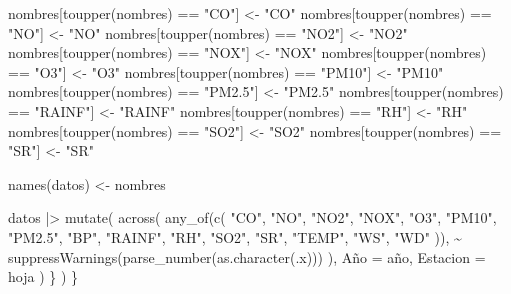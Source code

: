 \documentclass[
  letterpaper,
  DIV=11,
  numbers=noendperiod]{scrartcl}
\newenvironment{Shaded}{\begin{snugshade}}{\end{snugshade}}
\newcommand{\AttributeTok}[1]{\textcolor[rgb]{0.40,0.45,0.13}{#1}}
\newcommand{\FunctionTok}[1]{\textcolor[rgb]{0.28,0.35,0.67}{#1}}
\newcommand{\NormalTok}[1]{\textcolor[rgb]{0.00,0.23,0.31}{#1}}
\newcommand{\OtherTok}[1]{\textcolor[rgb]{0.00,0.23,0.31}{#1}}
\newcommand{\SpecialCharTok}[1]{\textcolor[rgb]{0.37,0.37,0.37}{#1}}
\newcommand{\StringTok}[1]{\textcolor[rgb]{0.13,0.47,0.30}{#1}}
\begin{document}
\begin{Shaded}
\begin{Highlighting}[]
\NormalTok{      nombres[}\FunctionTok{toupper}\NormalTok{(nombres) }\SpecialCharTok{==} \StringTok{"CO"}\NormalTok{] }\OtherTok{\textless{}{-}} \StringTok{"CO"}
\NormalTok{      nombres[}\FunctionTok{toupper}\NormalTok{(nombres) }\SpecialCharTok{==} \StringTok{"NO"}\NormalTok{] }\OtherTok{\textless{}{-}} \StringTok{"NO"}
\NormalTok{      nombres[}\FunctionTok{toupper}\NormalTok{(nombres) }\SpecialCharTok{==} \StringTok{"NO2"}\NormalTok{] }\OtherTok{\textless{}{-}} \StringTok{"NO2"}
\NormalTok{      nombres[}\FunctionTok{toupper}\NormalTok{(nombres) }\SpecialCharTok{==} \StringTok{"NOX"}\NormalTok{] }\OtherTok{\textless{}{-}} \StringTok{"NOX"}
\NormalTok{      nombres[}\FunctionTok{toupper}\NormalTok{(nombres) }\SpecialCharTok{==} \StringTok{"O3"}\NormalTok{] }\OtherTok{\textless{}{-}} \StringTok{"O3"}
\NormalTok{      nombres[}\FunctionTok{toupper}\NormalTok{(nombres) }\SpecialCharTok{==} \StringTok{"PM10"}\NormalTok{] }\OtherTok{\textless{}{-}} \StringTok{"PM10"}
\NormalTok{      nombres[}\FunctionTok{toupper}\NormalTok{(nombres) }\SpecialCharTok{==} \StringTok{"PM2.5"}\NormalTok{] }\OtherTok{\textless{}{-}} \StringTok{"PM2.5"}
\NormalTok{      nombres[}\FunctionTok{toupper}\NormalTok{(nombres) }\SpecialCharTok{==} \StringTok{"RAINF"}\NormalTok{] }\OtherTok{\textless{}{-}} \StringTok{"RAINF"}
\NormalTok{      nombres[}\FunctionTok{toupper}\NormalTok{(nombres) }\SpecialCharTok{==} \StringTok{"RH"}\NormalTok{] }\OtherTok{\textless{}{-}} \StringTok{"RH"}
\NormalTok{      nombres[}\FunctionTok{toupper}\NormalTok{(nombres) }\SpecialCharTok{==} \StringTok{"SO2"}\NormalTok{] }\OtherTok{\textless{}{-}} \StringTok{"SO2"}
\NormalTok{      nombres[}\FunctionTok{toupper}\NormalTok{(nombres) }\SpecialCharTok{==} \StringTok{"SR"}\NormalTok{] }\OtherTok{\textless{}{-}} \StringTok{"SR"}
      
      \FunctionTok{names}\NormalTok{(datos) }\OtherTok{\textless{}{-}}\NormalTok{ nombres}
      
\NormalTok{      datos }\SpecialCharTok{|\textgreater{}}
        \FunctionTok{mutate}\NormalTok{(}
          \FunctionTok{across}\NormalTok{(}
            \FunctionTok{any\_of}\NormalTok{(}\FunctionTok{c}\NormalTok{(}
              \StringTok{"CO"}\NormalTok{, }\StringTok{"NO"}\NormalTok{, }\StringTok{"NO2"}\NormalTok{, }\StringTok{"NOX"}\NormalTok{, }\StringTok{"O3"}\NormalTok{,}
              \StringTok{"PM10"}\NormalTok{, }\StringTok{"PM2.5"}\NormalTok{, }\StringTok{"BP"}\NormalTok{, }\StringTok{"RAINF"}\NormalTok{,}
              \StringTok{"RH"}\NormalTok{, }\StringTok{"SO2"}\NormalTok{, }\StringTok{"SR"}\NormalTok{, }\StringTok{"TEMP"}\NormalTok{, }\StringTok{"WS"}\NormalTok{, }\StringTok{"WD"}
\NormalTok{            )),}
            \SpecialCharTok{\textasciitilde{}} \FunctionTok{suppressWarnings}\NormalTok{(}\FunctionTok{parse\_number}\NormalTok{(}\FunctionTok{as.character}\NormalTok{(.x)))}
\NormalTok{          ),}
\NormalTok{          Año }\OtherTok{=}\NormalTok{ año,}
          \AttributeTok{Estacion =}\NormalTok{ hoja}
\NormalTok{        )}
\NormalTok{    \}}
\NormalTok{  )}
\NormalTok{\}}


\end{Highlighting}
\end{Shaded}
\end{document}
